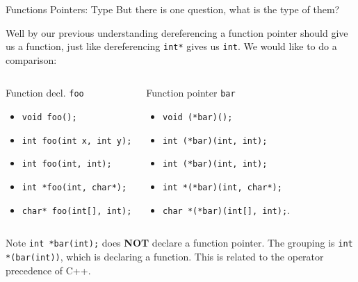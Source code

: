 \begin{frame}{Functions Pointers: Type}
But there is one question, what is the type of them? 

Well by our previous understanding dereferencing a function pointer should give us a function, just like dereferencing \texttt{int*} gives us \texttt{int}. We would like to do a comparison:

\vspace{-.2in}
\begin{columns}
	\begin{block}{Function decl. \texttt{foo}}
		\begin{itemize}
			\item \texttt{void foo();}
			\item \texttt{int foo(int x, int y);}
			\item \texttt{int foo(int, int);}
			\item \texttt{int *foo(int, char*);}
			\item \texttt{char* foo(int[], int);}
		\end{itemize}
	\end{block}
	\begin{block}{Function pointer \texttt{bar}}
		\begin{itemize}
			\item \texttt{void (*bar)();}
			\item \texttt{int (*bar)(int, int);}
			\item \texttt{int (*bar)(int, int);}
			\item \texttt{int *(*bar)(int, char*);}
			\item \texttt{char *(*bar)(int[], int);}.
		\end{itemize}
	\end{block}
\end{columns}
Note \texttt{int *bar(int);} does \textbf{NOT} declare a function pointer. The grouping is \texttt{int *(bar(int))}, which is declaring a function. This is related to the operator precedence of C++.
\end{frame}

